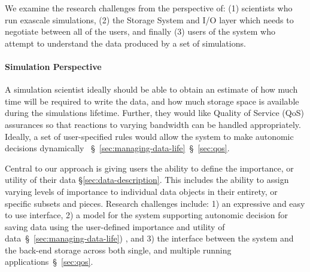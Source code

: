 We  examine the research challenges from the perspective of:
%
(1) scientists who run exascale simulations,
%
(2) the Storage System and I/O layer which needs to negotiate between all of
the users, and finally
%
(3) users of the system who attempt to understand the data
produced by a set of simulations.

\paragraph{Simulation Perspective}
\label{subsec:sim-perspective}
A simulation scientist ideally should be able to
obtain an estimate of how much time will be required to write the data,
and how much storage space is available during the simulations lifetime.
Further, they would like Quality of Service (QoS) assurances so that reactions
to varying bandwidth can be handled appropriately. Ideally, a set of
user-specified rules would allow the system to make autonomic decisions dynamically
~\S~\ref{sec:managing-data-life}~\S~\ref{sec:qos}.
%

Central to our approach is giving users the ability to define the importance, or utility of their data    
 \S\ref{sec:data-description}.
This includes the ability to assign varying levels of importance to individual data objects in their entirety, or specific
subsets and pieces.
Research challenges include: 1) an expressive and easy to use interface, 2) a model for the system supporting
autonomic decision for saving data using the user-defined importance and utility of data~\S~\ref{sec:managing-data-life})
, and 3) the interface between
the system and the back-end storage across both single, and multiple running applications~\S~\ref{sec:qos}.

